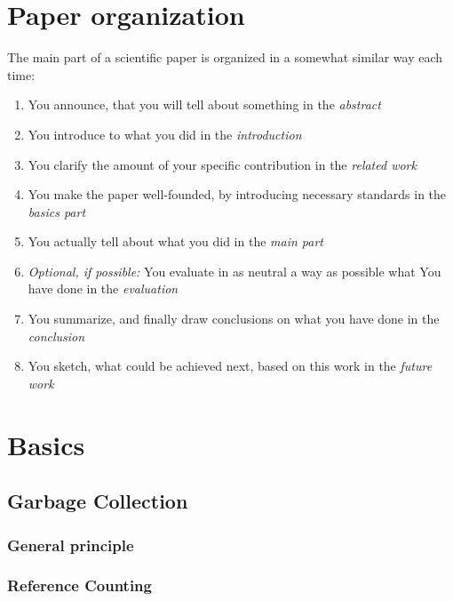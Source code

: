 \documentclass[twocolumn]{article}
\begin{document}

\section{Paper organization}
The main part of a scientific paper is organized in a somewhat similar way
each time:
\begin{enumerate}
\item You announce, that you will tell about something in the \emph{abstract}
\item You introduce to what you did in the \emph{introduction}
\item You clarify the amount of your specific contribution in the \emph{related work}
\item You make the paper well-founded, by introducing necessary standards in the \emph{basics part}
\item You actually tell about what you did in the \emph{main part}
\item \emph{Optional, if possible:} You evaluate in as neutral a way as possible what You have done in the \emph{evaluation}
\item You summarize, and finally draw conclusions on what you have done in the \emph{conclusion}
\item You sketch, what could be achieved next, based on this work in the \emph{future work}
\end{enumerate}

\section{Basics}
\subsection{Garbage Collection}
\subsubsection{General principle}
\subsubsection{Reference Counting}
\end{document}
